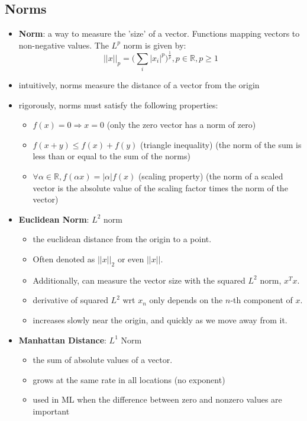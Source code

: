 \subsection{Norms}
\begin{itemize}
    \item \textbf{Norm}: a way to measure the 'size' of a vector. Functions mapping vectors to non-negative values. The $L^p$ norm is given by: 
    $$ ||x||_p = \Big( \sum_i |x_i|^p \Big)^{\frac{1}{p}}, p \in \mathbb{R}, p \geq 1 $$
    \item intuitively, norms measure the distance of a vector from the origin
    \item rigorously, norms must satisfy the following properties:
    \begin{itemize}
        \item $f(x) = 0 \Rightarrow x = 0$ (only the zero vector has a norm of zero)
        \item $f(x + y) \leq f(x) + f(y)$ (triangle inequality) (the norm of the sum is less than or equal to the sum of the norms)
        \item $\forall \alpha \in \mathbb{R}, f(\alpha x) = |\alpha| f(x)$ (scaling property) (the norm of a scaled vector is the absolute value of the scaling factor times the norm of the vector)
    \end{itemize}
    \item \textbf{Euclidean Norm}: $L^2$ norm 
    \begin{itemize}
        \item the euclidean distance from the origin to a point. 
        \item Often denoted as $||x||_2$ or even $||x||$.
        \item Additionally, can measure the vector size with the squared $L^2$ norm, $x^T x$.
        \item derivative of squared $L^2$ wrt $x_n$ only depends on the $n$-th component of $x$.
        \item increases slowly near the origin, and quickly as we move away from it.
    \end{itemize}
    \item \textbf{Manhattan Distance}: $L^1$ Norm
    \begin{itemize}
        \item the sum of absolute values of a vector.
        \item grows at the same rate in all locations (no exponent)
        \item used in ML when the difference between zero and nonzero values are important

\end{itemize}
\end{itemize}
